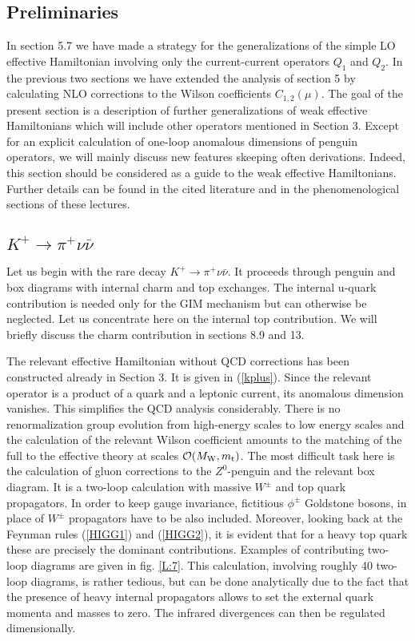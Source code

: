 \documentclass[12pt,rotate]{article}
\newcommand{\mt}{m_{\rm t}}
\newcommand{\mw}{M_{\rm W}}
\newcommand{\ord}{{\cal O}}
\def\kpnn{$K^+\rightarrow\pi^+\nu\bar\nu$}
\begin{document}
\begin{itemize}
\begin{itemize}
\subsection{Preliminaries}
In section 5.7 we have made a strategy for the generalizations of the
simple LO effective Hamiltonian involving only the current-current
operators $Q_1$ and $Q_2$. In the previous two sections we have extended
the analysis of section 5 by calculating NLO corrections to the
Wilson coefficients $C_{1,2}(\mu)$. The goal of the present section
is a description of further generalizations of weak effective
Hamiltonians which will include other operators mentioned
in Section 3. 
Except for an explicit calculation of one-loop anomalous
dimensions of penguin operators,
we will mainly discuss new features skeeping often
derivations. Indeed, this section should be considered as a guide
to the weak effective Hamiltonians. Further details can be found in
the cited literature and in the phenomenological sections of these
lectures.
\subsection{\kpnn}
Let us begin with the rare decay \kpnn. It proceeds through penguin
and box diagrams with internal charm and top exchanges. The internal
u-quark contribution is needed only for the GIM mechanism but can  
otherwise be neglected. Let us concentrate here on the internal top
contribution. We will briefly discuss the charm contribution in
sections 8.9 and 13.

The relevant effective Hamiltonian without QCD corrections has been
constructed already in Section 3. It is given in (\ref{kplus}).
Since the relevant operator is a product of a quark and a leptonic
current, its anomalous dimension vanishes. This simplifies the
QCD analysis considerably. There is no renormalization group
evolution from high-energy scales to low energy scales and the
calculation of the relevant Wilson coefficient amounts to the
matching of the full to the effective theory at scales $\ord(\mw,\mt)$.
The most difficult task here is the calculation of gluon corrections
to the $Z^0$-penguin and the relevant box diagram. It is a two-loop
calculation with massive $W^\pm$ and top quark propagators. In
order to keep gauge invariance, fictitious $\phi^\pm$ Goldstone
bosons, in place of $W^\pm$ propagators have to be also included.
Moreover, looking back at the Feynman rules (\ref{HIGG1}) and
(\ref{HIGG2}), it is evident that for a heavy top quark these are
precisely the dominant contributions. 
Examples of contributing two-loop diagrams are given in fig. \ref{L:7}.
This calculation, involving
roughly 40 two-loop diagrams, is rather tedious, but can be done
analytically due to the fact that the presence of heavy internal
propagators allows to set the external quark momenta
and masses to zero. The infrared divergences can then be regulated
dimensionally. 


\end{itemize}
\end{itemize}
\end{document}

